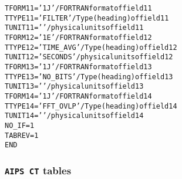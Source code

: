 \documentclass[twoside]{article}
\begin{document}
\begin{alltt}
TFORM11 = '1J      '           / FORTRAN format of field 11
TTYPE11 = 'FILTER          '   / Type (heading) of field 11
TUNIT11 = '        '           / physical units of field 11
TFORM12 = '1E      '           / FORTRAN format of field 12
TTYPE12 = 'TIME_AVG        '   / Type (heading) of field 12
TUNIT12 = 'SECONDS '           / physical units of field 12
TFORM13 = '1J      '           / FORTRAN format of field 13
TTYPE13 = 'NO_BITS         '   / Type (heading) of field 13
TUNIT13 = '        '           / physical units of field 13
TFORM14 = '1J      '           / FORTRAN format of field 14
TTYPE14 = 'FFT_OVLP        '   / Type (heading) of field 14
TUNIT14 = '        '           / physical units of field 14
NO_IF   =            1
TABREV  =            1
END
\end{alltt}

\subsubsection{{\tt AIPS CT} tables}
\label{Appe:CTtable}
\end{document}
